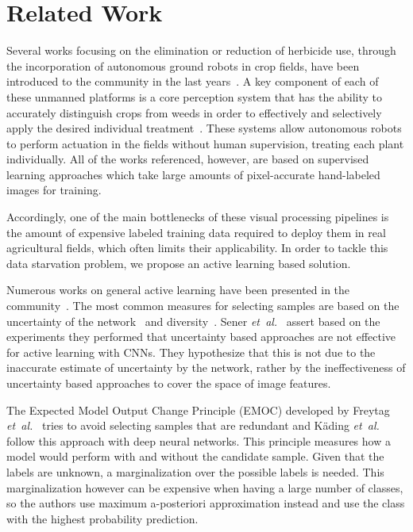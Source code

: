 \documentclass[letterpaper, 10 pt, conference]{ieeeconf}  %
\newcommand\etal{\emph{et~al.}}
\begin{document}
\section{Related Work}
\label{sec:related}



Several works focusing on the elimination or reduction of herbicide use,
through the incorporation of autonomous ground robots in crop fields, have
been introduced to the community in the last years~\cite{ducket2018arxiv,liebisch2016wslw,mccool2018ral}.
A key component of each of these unmanned platforms is a core perception system that
has the ability to accurately distinguish crops from weeds in order to effectively
and selectively apply the desired individual treatment~\cite{lottes2018iros, mccool2017ral,milioto2017uavg,milioto2018real,sa2018rs}.
These systems allow autonomous robots to perform actuation in the fields without human supervision, treating each plant individually.
All of the works referenced, however, are based on supervised learning approaches which take large amounts of pixel-accurate hand-labeled images for training. 

Accordingly, one of the main bottlenecks of these visual processing pipelines is the amount of expensive labeled training data required to deploy them in real agricultural fields, which often limits their applicability. In order to tackle this data starvation problem, we propose an active learning based solution.

Numerous works on general active learning have been presented in the community~\cite{settles2009active,guyon2011results,holub2008entropy, yoo2019learning}. The most common measures for selecting samples are based on the uncertainty of the network~\cite{zhou2017fine, yang2017suggestive, gal2017deep, wang2017cost} and diversity~\cite{zhou2017fine, dutt2016active, kading2016active}.  Sener \etal~\cite{sener2017geometric} assert based on the experiments they performed that uncertainty based approaches are not effective for active learning with CNNs. They hypothesize that this is not due to the inaccurate estimate of uncertainty by the network, rather by the ineffectiveness of uncertainty based approaches to cover the space of image features.

The Expected Model Output Change Principle (EMOC) developed by Freytag \etal~\cite{freytag2014selecting} tries to avoid selecting samples that are redundant and K{\"a}ding \etal~\cite{kading2016active} follow this approach with deep neural networks. This principle measures how a model would perform with and without the candidate sample. Given that the labels are unknown, a marginalization over the possible labels is needed. This marginalization however can be expensive when having a large number of classes, so the authors use maximum a-posteriori approximation instead and use the class with the highest probability prediction.
\end{document}
